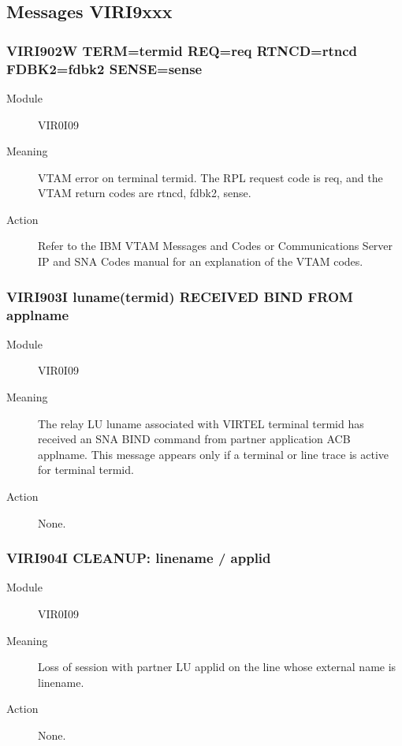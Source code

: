 \documentclass[letterpaper,10pt,english]{sphinxmanual}
\begin{document}
\subsection{Messages VIRI9xxx}
\label{\detokenize{messages:messages-viri9xxx}}

\subsubsection{VIRI902W TERM=termid REQ=req RTNCD=rtncd FDBK2=fdbk2 SENSE=sense}
\label{\detokenize{messages:viri902w-term-termid-req-req-rtncd-rtncd-fdbk2-fdbk2-sense-sense}}\begin{description}
\item[{Module}] \leavevmode
VIR0I09

\item[{Meaning}] \leavevmode
VTAM error on terminal termid. The RPL request code is req, and the VTAM return codes are rtncd, fdbk2, sense.

\item[{Action}] \leavevmode
Refer to the IBM VTAM Messages and Codes or Communications Server IP and SNA Codes manual for an explanation of the VTAM codes.

\end{description}


\subsubsection{VIRI903I luname(termid) RECEIVED BIND FROM applname}
\label{\detokenize{messages:viri903i-luname-termid-received-bind-from-applname}}\begin{description}
\item[{Module}] \leavevmode
VIR0I09

\item[{Meaning}] \leavevmode
The relay LU luname associated with VIRTEL terminal termid has received an SNA BIND command from partner application ACB applname. This message appears only if a terminal or line trace is active for terminal termid.

\item[{Action}] \leavevmode
None.

\end{description}


\subsubsection{VIRI904I CLEANUP: linename / applid}
\label{\detokenize{messages:viri904i-cleanup-linename-applid}}\begin{description}
\item[{Module}] \leavevmode
VIR0I09

\item[{Meaning}] \leavevmode
Loss of session with partner LU applid on the line whose external name is linename.

\item[{Action}] \leavevmode
None.

\end{description}
\end{document}
